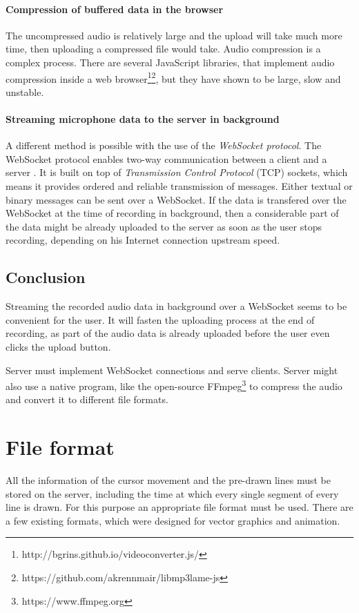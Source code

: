 \paragraph{Compression of buffered data in the browser} The uncompressed audio is relatively large and the upload will take much more time, then uploading a compressed file would take. Audio compression is a complex process. There are several JavaScript libraries, that implement audio compression inside a web browser\footnote{http://bgrins.github.io/videoconverter.js/}\footnote{https://github.com/akrennmair/libmp3lame-js}, but they have shown to be large, slow and unstable.

\paragraph{Streaming microphone data to the server in background} A different method is possible with the use of the \textit{WebSocket protocol}. The WebSocket protocol enables two-way communication between a client and a server \cite{websocket}. It is built on top of \textit{Transmission Control Protocol} (TCP) sockets, which means it provides ordered and reliable transmission of messages. Either textual or binary messages can be sent over a WebSocket. If the data is transfered over the WebSocket at the time of recording in background, then a considerable part of the data might be already uploaded to the server as soon as the user stops recording, depending on his Internet connection upstream speed.

\subsection{Conclusion}
Streaming the recorded audio data in background over a WebSocket seems to be convenient for the user. It will fasten the uploading process at the end of recording, as part of the audio data is already uploaded before the user even clicks the upload button.

Server must implement WebSocket connections and serve clients. Server might also use a native program, like the open-source FFmpeg\footnote{https://www.ffmpeg.org} to compress the audio and convert it to different file formats.









\section{File format}
All the information of the cursor movement and the pre-drawn lines must be stored on the server, including the time at which every single segment of every line is drawn. For this purpose an appropriate file format must be used. There are a few existing formats, which were designed for vector graphics and animation.

